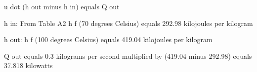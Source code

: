 u dot (h out minus h in) equals Q out  

h in:  
From Table A2  
h f (70 degrees Celsius) equals 292.98 kilojoules per kilogram  

h out:  
h f (100 degrees Celsius) equals 419.04 kilojoules per kilogram  

Q out equals 0.3 kilograms per second multiplied by (419.04 minus 292.98)  
equals 37.818 kilowatts